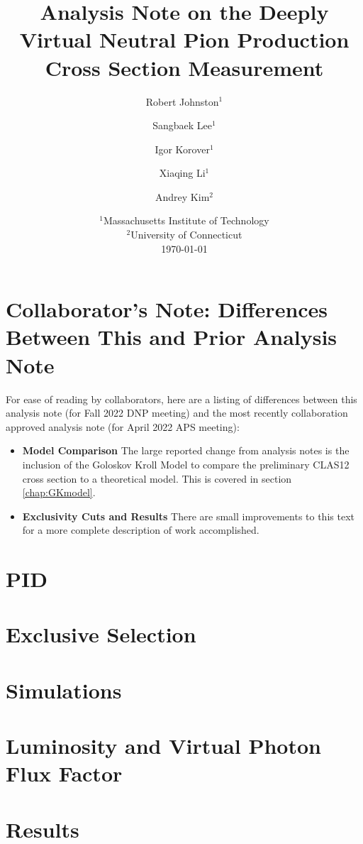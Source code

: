 \documentclass[11pt]{report}
\title{Analysis Note on the Deeply Virtual Neutral Pion Production Cross Section Measurement}
\author{Robert Johnston$^1$ \and Sangbaek Lee$^1$
\and Igor Korover$^1$
\and Xiaqing Li$^1$
\and Andrey Kim$^2$
}
\date{%
    $^1$Massachusetts Institute of Technology\\%
    $^2$University of Connecticut\\[2ex]%
    \today
}
\begin{document}
\maketitle
\tableofcontents
\cleardoublepage
{}
\listoffigures

\chapter{Collaborator's Note: Differences Between This and Prior Analysis Note}
For ease of reading by collaborators, here are a listing of differences between this analysis note (for Fall 2022 DNP meeting) and the most recently collaboration approved analysis note (for April 2022 APS meeting):
\begin{itemize}
    \item \textbf{Model Comparison} The large reported change from analysis notes is the inclusion of the Goloskov Kroll Model to compare the preliminary CLAS12 cross section to a theoretical model. This is covered in section \ref{chap:GKmodel}.
    \item \textbf{Exclusivity Cuts and Results} There are small improvements to this text for a more complete description of work accomplished.
\end{itemize}

\chapter{PID}


\chapter{Exclusive Selection}  
\label{chap:exclusive}


\chapter{Simulations}
\label{chap:acc}


\chapter{Luminosity and Virtual Photon Flux Factor}
\label{chap:lumi}


\chapter{Results}

\end{document}
